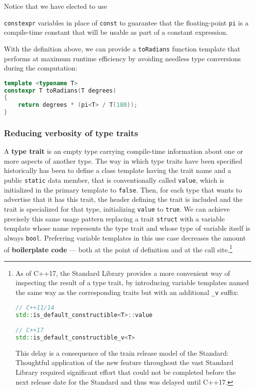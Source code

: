 \noindent Notice that we have elected to use {\texttt{constexpr} variables in place of  \texttt{const} to guarantee that the floating-point \lstinline!pi! is a compile-time constant that will be usable as part of a constant expression.

With the definition above, we can provide a
\texttt{toRadians} function template that performs at maximum runtime
efficiency by avoiding needless type conversions during the computation:

\begin{lstlisting}[language=C++]
template <typename T>
constexpr T toRadians(T degrees)
{
    return degrees * (pi<T> / T(180));
}
\end{lstlisting}


\subsubsection[Reducing verbosity of type traits]{Reducing verbosity of type traits}\label{reducing-verbosity-of-type-traits}

A \textbf{type trait} is an empty type carrying compile-time information
about one or more aspects of another type. The way in which type traits
have been specified historically has been to define a class template
having the trait name and a public \texttt{static}
data member, that is conventionally called \texttt{value}, which is
initialized in the primary template to \texttt{false}. Then, for each
type that wants to advertise that it has this trait, the header defining
the trait is included and the trait is specialized for that type,
initializing \texttt{value} to \texttt{true}. We can achieve precisely
this same usage pattern replacing a trait \texttt{struct} with a
variable template whose name represents the type trait and whose type of
variable itself is always \texttt{bool}. Preferring variable templates
in this use case decreases the amount of \textbf{boilerplate code} ---
both at the point of definition and at the call
site.{\cprotect\footnote{As of C++17, the Standard Library provides a
more convenient way of inspecting the result of a type trait, by
introducing variable templates named the same way as the corresponding
traits but with an additional \texttt{\_v} suffix:

\begin{lstlisting}[language=C++, basicstyle={\ttfamily\footnotesize}]
// C++11/14
std::is_default_constructible<T>::value

// C++17
std::is_default_constructible_v<T>
\end{lstlisting}
This delay is a consequence of the train release model of the Standard: Thoughtful application of the new feature throughout the vast Standard Library required significant effort that could not be completed before the next release date for the Standard and thus was delayed until C++17.
      }}

}
